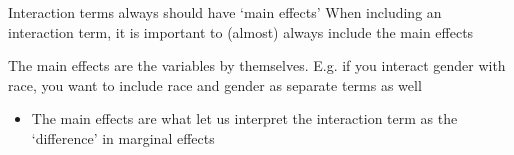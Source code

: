 \documentclass[aspectratio=169,t,11pt,table]{beamer}
\begin{document}
\begin{frame}{Interaction terms always should have `main effects'}
  When including an interaction term, it is important to (almost) always include the \alert{main effects}

  \bigskip
  The \alert{main effects} are the variables by themselves. E.g. if you interact gender with race, you want to include race and gender as separate terms as well 
  \begin{itemize}
    \item The main effects are what let us interpret the interaction term as the `difference' in marginal effects
  \end{itemize}
\end{frame}

%   
%     
% 
% 
\end{document}
